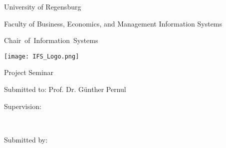 %
%
%

\thispagestyle{empty}
\begin{titlepage}


\begin{adjustwidth}{-2cm}{}


\renewcommand{\thepage}{}

\begin{center}


\large{University of Regensburg\\}

\large{Faculty of Business, Economics, and Management Information Systems\\}

\large{\mbox{{Chair of Information Systems}}}

\vspace*{30mm}

\Large{\textbf{\titlethema}}

\vspace*{25mm}
\texttt{[image: IFS\_Logo.png]}
\vspace*{15mm}


\Large{Project Seminar}

\vspace*{10mm}



\vspace*{10mm}



\Large{Submitted to: Prof. Dr. Günther Pernul\\}

\Large{Supervision: \supervisor\\} 

\vspace*{10mm}



\large{\submissiondate\\}
\vfill

\end{center}
\vspace*{6mm}
\begin{flushleft}
Submitted by:\\
\vspace*{7pt}


\end{flushleft}
\end{adjustwidth}
\end{titlepage}
